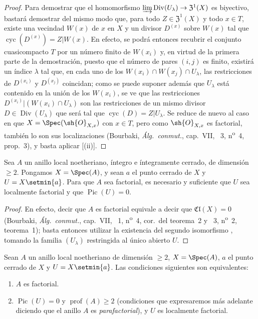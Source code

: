 \begin{proof}
Para demostrar que el homomorfismo $\varinjlim\operatorname{Div}(U_\lambda)\to\mathfrak{Z}^1(X)$ es biyectivo, bastará demostrar del mismo modo que, para todo $Z\in\mathfrak{Z}^1(X)$ y todo $x\in T$, existe una vecindad $W(x)$ 
de $x$ en $X$ y un divisor $D^{(x)}$ sobre $W(x)$ tal que $\operatorname{cyc}(D^{(x)})=Z|W(x)$.
En efecto, se podrá entonces recubrir el conjunto cuasicompacto $T$ por un número finito de $W(x_i)$ y, en virtud de la primera parte de la demostración, puesto que el número de pares $(i,j)$ es finito, existirá un índice $\lambda$ tal que, en cada uno de los $W(x_i)\cap W(x_j)\cap U_\lambda$, las restricciones de $D^{(x_i)}$ y $D^{(x_j)}$ coincidan;
como se puede suponer además que $U_\lambda$ está contenido en la unión de los $W(x_i)$, se ve que las restricciones $D^{(x_i)}|(W(x_i)\cap U_\lambda)$ son las restricciones de un mismo divisor $D\in\operatorname{Div}(U_\lambda)$ que será tal que $\operatorname{cyc}(D)=Z|U_\lambda$.
Se reduce de nuevo al caso en que $X=\Spec(\sh{O}_{X,x})$ con $x\in T$, pero como $\sh{O}_{X,x}$ es factorial, también lo son sus localizaciones (Bourbaki, \emph{Álg.\ conmut.}, cap.~VII, \textsection~3, n\textsuperscript{o}~4, prop.~3), y basta aplicar [(ii)].
\end{proof}

\begin{corollary}[21.6.13]
\label{IV.21.6.13}
Sea $A$ un anillo local noetheriano, íntegro e íntegramente cerrado, de dimensión $\geq2$.
Pongamos $X=\Spec(A)$, y sean $a$ el punto cerrado de $X$ y $U=X\setmin\{a\}$.
Para que $A$ sea factorial, es necesario y suficiente que $U$ sea localmente factorial y que $\operatorname{Pic}(U)=0$.
\end{corollary}

\begin{proof}
En efecto, decir que $A$ es factorial equivale a decir que $\mathfrak{Cl}(X)=0$ (Bourbaki, \emph{Álg.\ conmut.}, cap.~VII, \textsection~1, n\textsuperscript{o}~4, cor.\ del teorema~2 y \textsection~3, n\textsuperscript{o}~2, teorema~1);
basta entonces utilizar la existencia del segundo isomorfismo , tomando la familia $(U_\lambda)$ restringida al único abierto $U$.
\end{proof}

\begin{corollary}[21.6.14]
\label{IV.21.6.14}
Sean $A$ un anillo local noetheriano de dimensión $\geq2$, $X=\Spec(A)$, $a$ el punto cerrado de $X$ y $U=X\setmin\{a\}$.
Las condiciones siguientes son equivalentes:
\begin{enumerate}[label=\emph{\alph*)}]
  \item $A$ es factorial.
  \item $\operatorname{Pic}(U)=0$ y $\operatorname{prof}(A)\geq2$ \textup{(condiciones que expresaremos más adelante  diciendo que el anillo $A$ es \emph{parafactorial})}, y $U$ es localmente factorial.
\end{enumerate}
\end{corollary}

